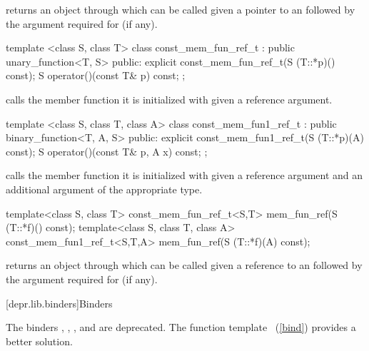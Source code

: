 \begin{itemdescr}
\pnum
{} returns an object through which  can be
called given a pointer to an  followed by the argument required for
 (if any).
\end{itemdescr}

%
\begin{itemdecl}
template <class S, class T> class const_mem_fun_ref_t
      : public unary_function<T, S> {
public:
  explicit const_mem_fun_ref_t(S (T::*p)() const);
  S operator()(const T& p) const;
};
\end{itemdecl}

\begin{itemdescr}
\pnum
{} calls the member function it is initialized with
given a reference argument.
\end{itemdescr}

%
\begin{itemdecl}
template <class S, class T, class A> class const_mem_fun1_ref_t
      : public binary_function<T, A, S> {
public:
  explicit const_mem_fun1_ref_t(S (T::*p)(A) const);
  S operator()(const T& p, A x) const;
};
\end{itemdecl}

\begin{itemdescr}
\pnum
{} calls the member function it is initialized
with given a reference argument and an additional argument of the appropriate
type.
\end{itemdescr}

%
\begin{itemdecl}
template<class S, class T> const_mem_fun_ref_t<S,T>
   mem_fun_ref(S (T::*f)() const);
template<class S, class T, class A> const_mem_fun1_ref_t<S,T,A>
    mem_fun_ref(S (T::*f)(A) const);
\end{itemdecl}

\begin{itemdescr}
\pnum
{} returns an object through which 
can be called given a reference to an  followed by the argument
required for  (if any).
\end{itemdescr}

[depr.lib.binders]{Binders}

The binders , ,
, and  are deprecated.
\enternote The function template
~(\ref{bind}) provides a better
solution.\exitnote

